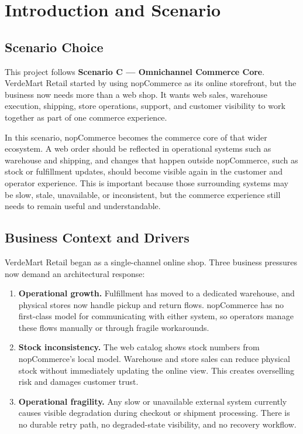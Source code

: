 \chapter{Introduction and Scenario}

\section{Scenario Choice}

This project follows \textbf{Scenario C --- Omnichannel Commerce Core}. VerdeMart Retail
started by using nopCommerce as its online storefront, but the business now needs more than a
web shop. It wants web sales, warehouse execution, shipping, store operations, support, and
customer visibility to work together as part of one commerce experience.

In this scenario, nopCommerce becomes the commerce core of that wider ecosystem. A web order
should be reflected in operational systems such as warehouse and shipping, and changes that
happen outside nopCommerce, such as stock or fulfillment updates, should become visible again
in the customer and operator experience. This is important because those surrounding systems
may be slow, stale, unavailable, or inconsistent, but the commerce experience still needs to
remain useful and understandable.

\section{Business Context and Drivers}

VerdeMart Retail began as a single-channel online shop. Three business pressures now demand an
architectural response:

\begin{enumerate}
    \item \textbf{Operational growth.} Fulfillment has moved to a dedicated warehouse, and
    physical stores now handle pickup and return flows. nopCommerce has no first-class model
    for communicating with either system, so operators manage these flows manually or through
    fragile workarounds.

    \item \textbf{Stock inconsistency.} The web catalog shows stock numbers from nopCommerce's
    local model. Warehouse and store sales can reduce physical stock without immediately
    updating the online view. This creates overselling risk and damages customer trust.

    \item \textbf{Operational fragility.} Any slow or unavailable external system currently
    causes visible degradation during checkout or shipment processing. There is no durable
    retry path, no degraded-state visibility, and no recovery workflow.
\end{enumerate}

